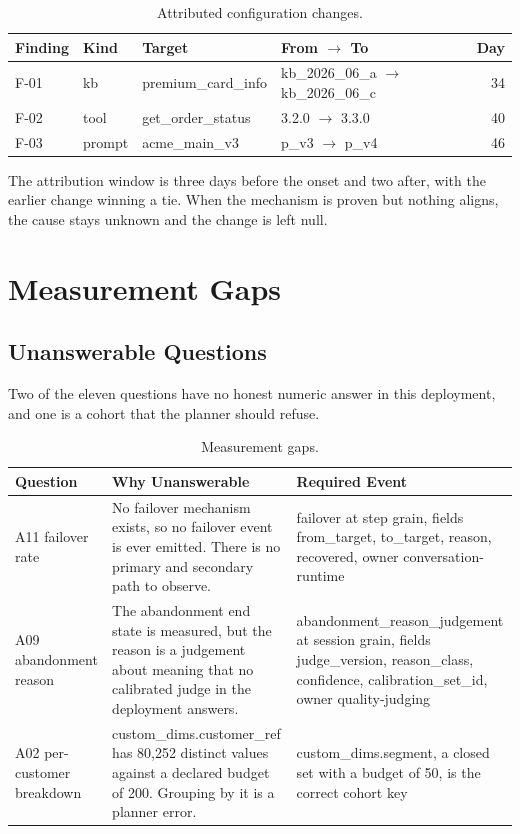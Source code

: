 \documentclass[8pt,twocolumn,a4paper]{extarticle}
\begin{document}
\begin{table}[H]
\centering
\caption{Attributed configuration changes.}
\label{tab:attrib}
\small
\begin{tabularx}{\columnwidth}{@{}l l X X r@{}}
\toprule
\textbf{Finding} & \textbf{Kind} & \textbf{Target} & \textbf{From $\rightarrow$ To} & \textbf{Day} \\
\midrule
F-01 & kb & premium\_card\_info & kb\_2026\_06\_a $\rightarrow$ kb\_2026\_06\_c & 34 \\
F-02 & tool & get\_order\_status & 3.2.0 $\rightarrow$ 3.3.0 & 40 \\
F-03 & prompt & acme\_main\_v3 & p\_v3 $\rightarrow$ p\_v4 & 46 \\
\bottomrule
\end{tabularx}
\end{table}

The attribution window is three days before the onset and two after,
with the earlier change winning a tie. When the mechanism is proven but
nothing aligns, the cause stays unknown and the change is left null.


\section{Measurement Gaps}

\subsection{Unanswerable Questions}

Two of the eleven questions have no honest numeric answer in this
deployment, and one is a cohort that the planner should refuse.

\begin{table}[t]
\centering
\caption{Measurement gaps.}
\label{tab:gaps}
\small
\begin{tabular}{p{}p{}p{}}
\toprule
\textbf{Question} & \textbf{Why Unanswerable} & \textbf{Required Event} \\
\midrule
A11 failover rate & No failover mechanism exists, so no failover event is ever emitted. There is no primary and secondary path to observe. & failover at step grain, fields from\_target, to\_target, reason, recovered, owner conversation-runtime \\
A09 abandonment reason & The abandonment end state is measured, but the reason is a judgement about meaning that no calibrated judge in the deployment answers. & abandonment\_reason\_judgement at session grain, fields judge\_version, reason\_class, confidence, calibration\_set\_id, owner quality-judging \\
A02 per-customer breakdown & custom\_dims.customer\_ref has 80,252 distinct values against a declared budget of 200. Grouping by it is a planner error. & custom\_dims.segment, a closed set with a budget of 50, is the correct cohort key \\
\bottomrule
\end{tabular}
\end{table}
\end{document}
